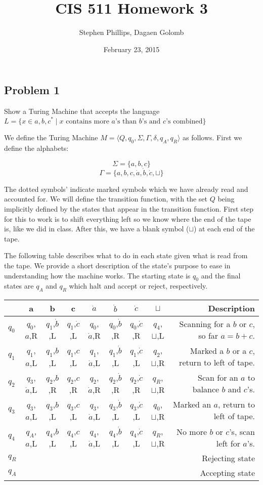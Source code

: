 \documentclass[english]{article}
\title{CIS 511 Homework 3}
\author{Stephen Phillips, Dagaen Golomb}
\date{February 23, 2015}
\begin{document}
\maketitle
\subsection*{Problem 1}
Show a Turing Machine that accepts the language
 $L = \{ x \in {a,b,c}^* \mid 
         \textrm{$x$ contains more $a$'s than $b$'s and $c$'s combined} \}$

We define the Turing Machine 
$M = \langle Q,q_0,\Sigma,\Gamma,\delta,q_A, q_R \rangle $ as follows. First
we define the alphabets:

\[ \Sigma = \{a,b,c\} \]
\[ \Gamma = \{a,b,c,\dot{a},\dot{b},\dot{c}, \sqcup \} \]

The dotted symbols' indicate marked symbols which we have already read and
accounted for. We will define the transition function, with the set $Q$ being
implicitly defined by the states that appear in the transition function. First
step for this to work is to shift everything left so we know where the end of the 
tape is, like we did in class. After this, we have a blank symbol ($\sqcup$) at each
end of the tape.

The following table describes what to do in each state given what is read from the
tape. We provide a short description of the state's purpose to ease in understanding
how the machine works. The starting state is $q_0$ and the final states are $q_A$
and $q_R$ which halt and accept or reject, respectively.

\begin{center}
	\begin{tabular}{ l | c | c | c | c | c | c | c | r }
		& a & b & c & $\dot{a}$ & $\dot{b}$ & $\dot{c}$ & $\sqcup$ & Description\\
		\hline
		$q_0$ & $q_0$,$a$,R & $q_1$,$\dot{b}$,L & $q_1$,$\dot{c}$,L & $q_0$,$\dot{a}$,R & $q_0$,$\dot{b}$,R & $q_0$,$\dot{c}$,R & $q_4$,$\sqcup$,L & Scanning for a $b$ or $c$, so far $a=b+c$. \\ \hline
		$q_1$ & $q_1$,$a$,L & $q_1$,$b$,L & $q_1$,$c$,L & $q_1$,$\dot{a}$,L & $q_1$,$\dot{b}$,L & $q_1$,$\dot{c}$,L & $q_2$,$\sqcup$,R & Marked a $b$ or a $c$, return to left of tape.\\ \hline
		$q_2$ & $q_3$,$\dot{a}$,L & $q_2$,$b$,R & $q_2$,$c$,R & $q_2$,$\dot{a}$,R & $q_2$,$\dot{b}$,R & $q_2$,$\dot{c}$,R & $q_R$,$\sqcup$,R & Scan for an $a$ to balance $b$ and $c$'s.\\ \hline
		$q_3$ & $q_3$,$a$,L & $q_3$,$b$,L & $q_3$,$c$,L & $q_3$,$\dot{a}$,L & $q_3$,$\dot{b}$,L & $q_3$,$\dot{c}$,L & $q_0$,$\sqcup$,R & Marked an $a$, return to left of tape.\\ \hline
		$q_4$ & $q_A$,$a$,L & $q_4$,$b$,L & $q_4$,$c$,L & $q_4$,$\dot{a}$,L & $q_4$,$\dot{b}$,L & $q_4$,$\dot{c}$,L & $q_R$,$\sqcup$,R & No more $b$ or $c$'s, scan left for $a$'s.\\ \hline
		$q_R$ &&&&&&&& Rejecting state \\ \hline
		$q_A$ &&&&&&&& Accepting state \\
		\hline
	\end{tabular}
\end{center}
\end{document}
